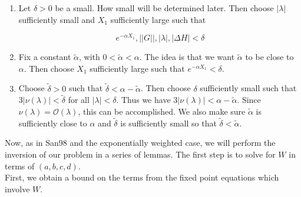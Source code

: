 \documentclass[12pt]{article}
\begin{document}
\begin{enumerate}

	\item Let $\delta > 0$ be a small. How small will be determined later. Then choose $|\lambda|$ sufficiently small and $X_1$ sufficiently large such that

	\begin{equation}
	e^{-\alpha X_1}, ||G||, |\lambda|, |\Delta H| < \delta
	\end{equation}

	\item Fix a constant $\tilde{\alpha}$, with $0 < \tilde{\alpha} < \alpha$. The idea is that we want $\tilde{\alpha}$ to be close to $\alpha$. Then choose $X_1$ sufficiently large such that $e^{-\alpha X_1} < \delta$.

	\item Choose $\tilde{\delta} > 0$ such that $\tilde{\delta} < \alpha - \tilde{\alpha}$. Then choose $\delta$ sufficiently small such that $3 |\nu(\lambda)| < \tilde{\delta}$ for all $|\lambda| < \delta$. Thus we have $3 |\nu(\lambda)| < \alpha - \tilde{\alpha}$. Since $\nu(\lambda) = \mathcal{O}(\lambda)$, this can be accomplished. We also make sure $\tilde{\alpha}$ is sufficiently close to $\alpha$ and $\tilde{\delta}$ is sufficiently small so that $\tilde{\delta} < \tilde{\alpha}$.

\end{enumerate}


Now, as in San98 and the exponentially weighted case, we will perform the inversion of our problem in a series of lemmas. The first step is to solve for $W$ in terms of $(a, b, c, d)$.\\

First, we obtain a bound on the terms from the fixed point equations which involve $W$. 

\end{document}
